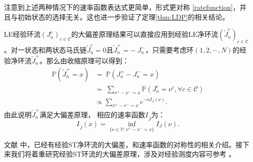 注意到上述两种情况下的速率函数表达式更简单，形式更对称 \eqref{ratefunction}，并且与初始状态的选择无关。这也进一步验证了定理\ref{thm:LDP}的相关结论。

LE经验环流$(J^{c}_n)_{c\in\mathcal{C}}$的大偏差原理结果可以直接应用到经验LE净环流$(\tilde{J}^{c}_n)_{c\in\mathcal{C}}$。对一状态和两状态马氏链$\tilde{J}^c_n = 0$且$\tilde{J}^+_n = -\ {J}^-_n$，只需要考虑环$(1, 2, \cdots ,N)$的经验净环流$\tilde{J}^+_n$。那么由收缩原理可以得到：
\begin{equation}\label{tilde I J}
	\begin{split}
		\mathbb{P}\left(\tilde{J}^{+}_n = x\right)
		&=\;\mathbb{P}\left(J^{+}_n-J^{-}_n = x\right)\\
		&=\;\sum_{\nu^{+}-\nu^{-}=x}\mathbb{P}\left(J^{c}_n=\nu^{c},\forall c\in\mathcal{C}\right)\\
		&\propto\sum_{\nu^{+}-\nu^{-}=x} e^{-nI_J(\nu)}.
	\end{split}
\end{equation}
由此说明$\tilde{J}^+_n$满足大偏差原理， 相应的速率函数$I_{\tilde{J}}$为：
\begin{equation*}
	I_{\tilde{J}}(x)=\inf_{\{\nu\in\mathcal{V}:\nu^{+}-\nu^{-}= x\}}I_J(\nu).
\end{equation*} 


文献 \cite{bertini2015flows} 中，已经有经验ST净环流的大偏差，和速率函数的对称性的相关介绍。接下来我们将着重研究经验ST环流的大偏差原理，涉及对经验测度内容可参考 \cite{den2000large}。

